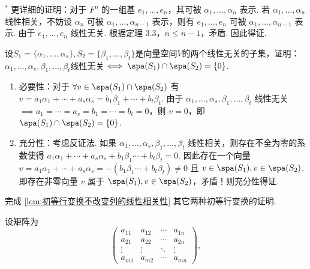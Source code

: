 \begin{exercise}
\begin{exgroup}
\begin{answer}
\begin{enumerate}
                      $^*$ 更详细的证明：对于 $F^n$ 的一组基 $e_1,\ldots,e_n$，其可被 $\alpha_1,\ldots,\alpha_n$ 表示. 若 $\alpha_1,\ldots,\alpha_n$ 线性相关，不妨设 $\alpha_n$ 可被 $\alpha_1,\ldots,\alpha_{n-1}$ 表示，则有 $e_1,\ldots,e_n$ 可被 $\alpha_1,\ldots,\alpha_{n-1}$ 表示. 由于 $e_1,\ldots,e_n$ 线性无关. 根据定理 3.3，$n\leqslant n-1$，矛盾. 因此得证.
            \end{enumerate}
        \end{answer}

        \item 设$S_1=\{\alpha_1,\ldots,\alpha_s\},S_2=\{\beta_1,\ldots,\beta_t\}$是向量空间$V$的两个线性无关的子集，证明：$\alpha_1,\ldots,\alpha_s,\beta_1,\ldots,\beta_t$线性无关$\iff \spa(S_1)\cap \spa(S_2)=\{0\}$.
        \begin{answer}
            \begin{enumerate}
                \item 必要性：对于 $\forall v\in\spa(S_1) \cap \spa(S_2)$ 有 $v=a_1\alpha_1+\cdots+a_s\alpha_s=b_1\beta_1+\cdots+b_t\beta_t$. 由于 $\alpha_1,\ldots,\alpha_s,\beta_1,\ldots,\beta_t$ 线性无关 $\implies a_1=\cdots=a_s=b_1=\cdots=b_t=0$，则 $v=0$，即 $\spa(S_1)\cap\spa(S_2)=\{0\}$.

                \item 充分性：考虑反证法. 如果 $\alpha_1,\ldots,\alpha_s,\beta_1,\ldots,\beta_t$ 线性相关，则存在不全为零的系数使得 $a_1\alpha_1+\cdots+a_s\alpha_s+b_1\beta_1\cdots+b_t\beta_t=0$. 因此存在一个向量 $v=a_1\alpha_1+\cdots+a_s\alpha_s=-(b_1\beta_1\cdots+b_t\beta_t)\neq 0$ 且 $v\in\spa(S_1),v\in\spa(S_2)$. 即存在非零向量 $v$ 属于 $\spa(S_1),v\in\spa(S_2)$，矛盾！则充分性得证.
            \end{enumerate}
        \end{answer}

        \item 完成 \autoref{lem:初等行变换不改变列的线性相关性} 其它两种初等行变换的证明.
        \begin{answer}
            设矩阵为
            \[
                \begin{pmatrix}
                    a_{11} & a_{12} & \cdots & a_{1n} \\
                    a_{21} & a_{22} & \cdots & a_{2n} \\
                    \vdots & \vdots & \ddots & \vdots \\
                    a_{m1} & a_{m2} & \cdots & a_{mn}
                \end{pmatrix},
            \]


\end{answer}
\end{exgroup}
\end{exercise}
